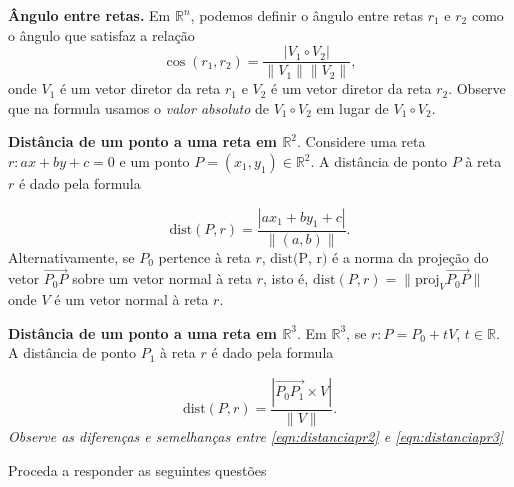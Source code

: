 \documentclass{article}
\theoremstyle{plain}
\theoremstyle{definition}
\theoremstyle{remark}
\begin{document}
  {\bf Ângulo entre retas.} Em $\mathbb{R}^{n}$, podemos definir o ângulo entre retas $r_1$ e $r_2$ 
 como o ângulo que satisfaz a relação 
  $$\cos (r_1,r_2)= \frac{|V_1 \circ V_2|}{\|V_1\|\|V_2\|}, $$
  onde $V_1$ é um vetor diretor da reta $r_1$ e 
   $V_2$ é um vetor diretor da reta $r_2$. Observe que na formula
   usamos o {\it valor absoluto} de  $V_1 \circ V_2$ em lugar de 
   $V_1 \circ V_2$.
   
 {\bf Distância de um ponto a uma reta em $\mathbb{R}^{2}$}.
 Considere uma reta $r: ax+by+c=0$ e um ponto 
 $P=(x_{1}, y_{1}) \in \mathbb{R}^{2}$. 
 A distância de ponto $P$ à reta $r$ é dado pela formula
 
 \begin{equation}
 \text{dist}(P,r)= \frac{|ax_{1}+by_{1}+c|}{\|(a,b)\|}.
 \label{eqn:distanciapr2}
 \end{equation}
 Alternativamente, se $P_{0}$ pertence à reta $r$, $\text{dist(P, r)}$ é a norma da projeção do vetor 
 $\overrightarrow{P_0P}$ sobre um vetor normal à reta $r$, isto é, $\text{dist}(P,r)=\|\text{proj}_{V}\overrightarrow{P_0P}\|$
 onde $V$ é um vetor normal à reta $r$.
 
 {\bf Distância de um ponto a uma reta em $\mathbb{R}^{3}$}.
 Em $\mathbb{R}^{3}$, se $r: P=P_0+tV$, $t \in \mathbb{R}$. 
 A distância de ponto $P_{1}$ à reta $r$ é dado pela formula
 
 \begin{equation}
 \text{dist}(P,r)= \frac{|\overrightarrow{P_0P_1}\times V|}{\|V\|}.
 \label{eqn:distanciapr3}
 \end{equation}
 {\it Observe as diferenças e semelhanças entre \eqref{eqn:distanciapr2}
 e \eqref{eqn:distanciapr3}}
 
Proceda a responder as seguintes questões 
  
\end{document}
